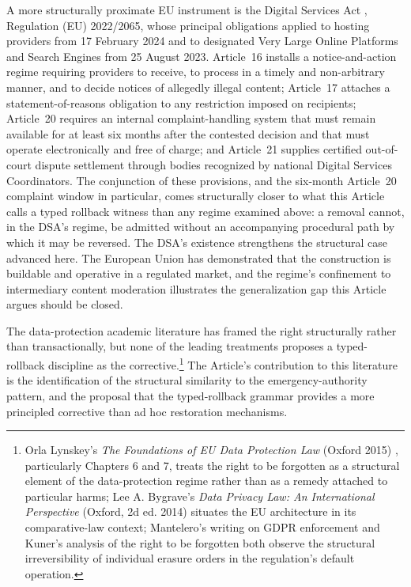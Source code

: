 A more structurally proximate EU instrument is the Digital Services Act
\cite{ref_dsa_2022}, Regulation (EU) 2022/2065, whose principal obligations applied to hosting
providers from 17 February 2024 and to designated Very Large Online Platforms and Search Engines
from 25 August 2023.
Article~16 installs a notice-and-action regime requiring providers to receive, to process in a timely
and non-arbitrary manner, and to decide notices of allegedly illegal content; Article~17 attaches a
statement-of-reasons obligation to any restriction imposed on recipients; Article~20 requires an
internal complaint-handling system that must remain available for at least six months after the
contested decision and that must operate electronically and free of charge; and Article~21 supplies
certified out-of-court dispute settlement through bodies recognized by national Digital Services
Coordinators.
The conjunction of these provisions, and the six-month Article~20 complaint window in particular,
comes structurally closer to what this Article calls a typed rollback witness than any regime examined
above: a removal cannot, in the DSA's regime, be admitted without an accompanying procedural path by
which it may be reversed.
The DSA's existence strengthens the structural case advanced here.
The European Union has demonstrated that the construction is buildable and operative in a regulated
market, and the regime's confinement to intermediary content moderation illustrates the
generalization gap this Article argues should be closed.

The data-protection academic literature has framed the right structurally rather than
transactionally, but none of the leading treatments proposes a typed-rollback discipline as the
corrective.\footnote{Orla Lynskey's \emph{The Foundations of EU Data Protection Law} (Oxford 2015)
\cite{ref_lynskey_foundations_eu_data_protection_2015}, particularly Chapters 6 and 7, treats the
right to be forgotten as a structural element of the data-protection regime rather than as a remedy
attached to particular harms; Lee A. Bygrave's \emph{Data Privacy Law: An International Perspective}
(Oxford, 2d ed. 2014) \cite{ref_bygrave_data_privacy_law_2014} situates the EU architecture in its
comparative-law context; Mantelero's writing on GDPR enforcement
\cite{ref_mantelero_gdpr_enforcement} and Kuner's analysis of the right to be forgotten
\cite{ref_kuner_gdpr_erasure} both observe the structural irreversibility of individual erasure
orders in the regulation's default operation.}
The Article's contribution to this literature is the identification of the structural similarity to the
emergency-authority pattern, and the proposal that the typed-rollback grammar provides a more
principled corrective than ad hoc restoration mechanisms.

